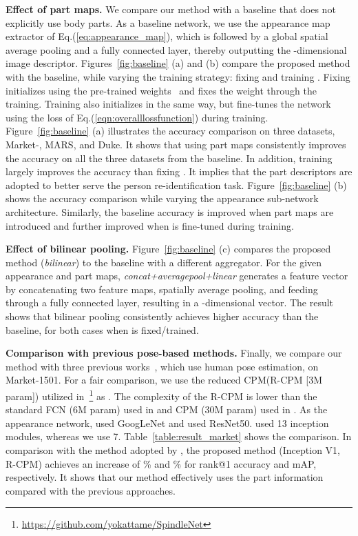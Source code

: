 \documentclass{llncs}
\begin{document}
\noindent\textbf{Effect of part maps.}
We compare our method with a baseline that does not explicitly use body parts.
As a baseline network, we use the appearance map extractor of Eq.(\ref{eq:appearance_map}), which is followed by a global spatial average pooling and a fully connected layer, thereby outputting the -dimensional image descriptor.
Figures~\ref{fig:baseline} (a) and (b) compare the proposed method with the baseline, while varying the training strategy: fixing and training . Fixing  initializes  using the pre-trained weights~\cite{conf/cvpr/cao17,coco} and fixes the weight through the training. Training  also initializes  in the same way, but fine-tunes the network using the loss of Eq.(\ref{eqn:overalllossfunction}) during training.
Figure~\ref{fig:baseline} (a) illustrates the accuracy comparison on three datasets,  Market-, MARS, and Duke. It shows that using part maps consistently improves the accuracy on all the three datasets from the baseline. In addition, training  largely improves the accuracy than fixing . It implies that the part descriptors are adopted to better serve the person re-identification task. Figure~\ref{fig:baseline} (b) shows the accuracy comparison while varying the {\color{black} appearance sub-network architecture}. Similarly, the baseline accuracy is improved when part maps are introduced and further improved when  is fine-tuned during training.

\noindent\textbf{Effect of bilinear pooling.}
Figure~\ref{fig:baseline} (c) compares the proposed method ({\it bilinear}) to the baseline with a different aggregator. For the given appearance and part maps, {\it concat+averagepool+linear} generates a feature vector by concatenating two feature maps, spatially average pooling, and feeding through a fully connected layer, resulting in a -dimensional vector. The result shows that bilinear pooling consistently achieves higher accuracy than the baseline, for both cases when  is fixed/trained.

\noindent\textbf{Comparison with previous pose-based methods.}
Finally, we compare our method with three previous works~\cite{ZhengHLY17,ZhaoTSSYYWT17,SuLZXGT17}, which use human pose estimation, on Market-1501. For a fair comparison, we use the reduced CPM(R-CPM [3M param]) utilized in~\cite{ZhaoTSSYYWT17}\footnote{\url{https://github.com/yokattame/SpindleNet}} as . The complexity of the R-CPM is lower than the standard FCN (6M param) used in \cite{SuLZXGT17} and CPM (30M param) used in \cite{ZhengHLY17}. As the appearance network, \cite{SuLZXGT17} used GoogLeNet and \cite{ZhengHLY17} used ResNet50. \cite{ZhaoTSSYYWT17} used 13 inception modules, whereas we use 7. Table~\ref{table:result_market} shows the comparison. In comparison with the method adopted by \cite{ZhengHLY17,ZhaoTSSYYWT17,SuLZXGT17}, the proposed method (Inception V1, R-CPM) achieves an increase of \% and \% for rank@1 accuracy and mAP, respectively. It shows that our method effectively uses the part information compared with the previous approaches.
\end{document}
